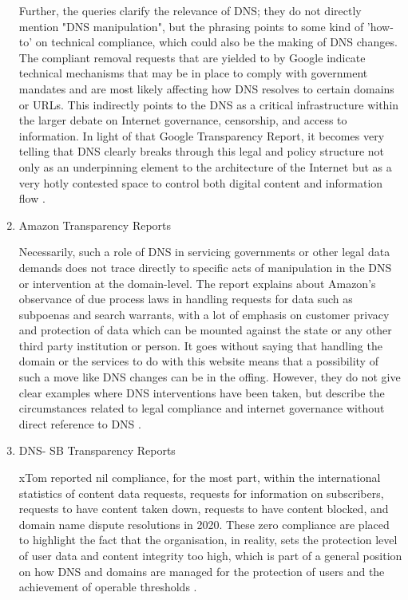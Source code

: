 \begin{enumerate}
Further, the queries clarify the relevance of DNS; they do not directly mention "DNS manipulation", but the phrasing points to some kind of 'how-to' on technical compliance, which could also be the making of DNS changes. The compliant removal requests that are yielded to by Google indicate technical mechanisms that may be in place to comply with government mandates and are most likely affecting how DNS resolves to certain domains or URLs. This indirectly points to the DNS as a critical infrastructure within the larger debate on Internet governance, censorship, and access to information. In light of that Google Transparency Report, it becomes very telling that DNS clearly breaks through this legal and policy structure not only as an underpinning element to the architecture of the Internet but as a very hotly contested space to control both digital content and information flow \cite{Google2023}.

\item Amazon Transparency Reports 

Necessarily, such a role of DNS in servicing governments or other legal data demands does not trace directly to specific acts of manipulation in the DNS or intervention at the domain-level. The report explains about Amazon's observance of due process laws in handling requests for data such as subpoenas and search warrants, with a lot of emphasis on customer privacy and protection of data which can be mounted against the state or any other third party institution or person. It goes without saying that handling the domain or the services to do with this website means that a possibility of such a move like DNS changes can be in the offing. However, they do not give clear examples where DNS interventions have been taken, but describe the circumstances related to legal compliance and internet governance without direct reference to DNS \cite{Amazon2023}.

\item DNS- SB  Transparency Reports

xTom reported nil compliance, for the most part, within the international statistics of content data requests, requests for information on subscribers, requests to have content taken down, requests to have content blocked, and domain name dispute resolutions in 2020. These zero compliance are placed to highlight the fact that the organisation, in reality, sets the protection level of user data and content integrity too high, which is part of a general position on how DNS and domains are managed for the protection of users and the achievement of operable thresholds \cite{DNSSB2023}.


\end{enumerate}
